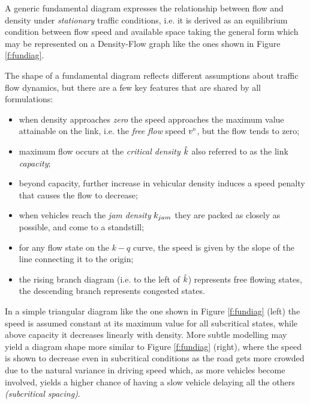 A generic fundamental diagram expresses the relationship between flow and density under \emph{stationary} traffic conditions, i.e. it is derived as an equilibrium condition between flow speed and available space taking the general form
which may be represented on a Density-Flow graph like the ones shown in Figure \ref{f:fundiag}.

The shape of a fundamental diagram reflects different assumptions about traffic flow dynamics, but there are a few key features that are shared by all formulations:
\begin{itemize}
\item when density approaches \emph{zero} the speed approaches the maximum value attainable on the link, i.e. the \emph{free flow} speed $v^{\scriptscriptstyle{0}}$, but the flow tends to zero;
\item maximum flow occurs at the \emph{critical density $\hat{k}$} also referred to as the link \emph{capacity};
\item beyond capacity, further increase in vehicular density induces a speed penalty that causes the flow to decrease;
\item when vehicles reach the \emph{jam density} $k_{jam}$ they are packed as closely as possible, and come to a standstill;
\item for any flow state on the $k-q$ curve, the speed is given by the slope of the line connecting it to the origin;
\item the rising branch diagram (i.e. to the left of $\hat{k}$) represents free flowing 
states, the descending branch represents congested states.
\end{itemize}

In a simple triangular diagram like the one shown in Figure \ref{f:fundiag} (left) the speed is assumed constant at its maximum value for all subcritical states, while above capacity it decreases linearly with density. More subtle modelling may yield a diagram shape more similar to Figure \ref{f:fundiag} (right), where the speed is shown to decrease even in subcritical conditions as the road gets more crowded due to the natural variance in driving speed which, as more vehicles become involved, yields a higher chance of having a slow vehicle delaying all the others \emph{(subcritical spacing)}.

